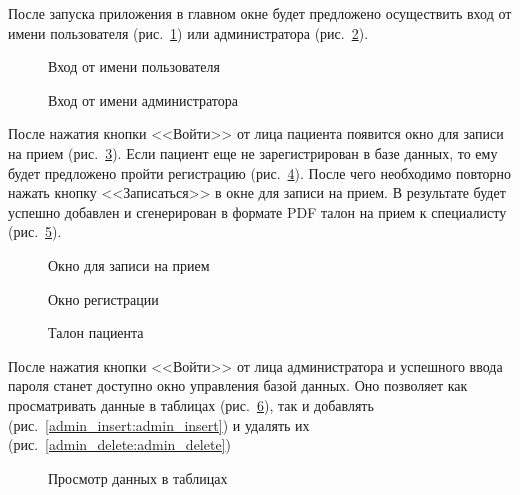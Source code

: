 После запуска приложения в главном окне будет предложено осуществить вход от имени пользователя (рис.~\ref{main_win_patient:main_win_patient}) или администратора (рис.~\ref{main_window_admin:main_window_admin}).

\begin{figure}[h!]
\caption{Вход от имени пользователя}
\label{main_win_patient:main_win_patient}
\end{figure}

\begin{figure}[h!]
\caption{Вход от имени администратора}
\label{main_window_admin:main_window_admin}
\end{figure}
 
После нажатия кнопки <<Войти>> от лица пациента появится окно для записи на прием (рис.~\ref{enroll:enroll}). 
Если пациент еще не зарегистрирован в базе данных, то ему будет предложено пройти регистрацию (рис.~\ref{register_win:register_win}). После чего необходимо повторно нажать кнопку <<Записаться>> в окне для записи на прием. В результате будет успешно добавлен и сгенерирован в формате PDF талон на прием к специалисту (рис.~\ref{talon:talon}).

\begin{figure}[h!]
\caption{Окно для записи на прием}
\label{enroll:enroll}
\end{figure}

\begin{figure}[h!]
\caption{Окно регистрации}
\label{register_win:register_win}
\end{figure}

\begin{figure}[h!]
\caption{Талон пациента}
\label{talon:talon}
\end{figure}

После нажатия кнопки <<Войти>> от лица администратора и успешного ввода пароля станет доступно окно управления базой данных. Оно позволяет как просматривать данные в таблицах (рис.~\ref{admin_find:admin_find}), так и добавлять (рис.~\ref{admin_insert:admin_insert}) и удалять их (рис.~\ref{admin_delete:admin_delete}) 

\begin{figure}[h!]
\caption{Просмотр данных в таблицах}
\label{admin_find:admin_find}
\end{figure}

